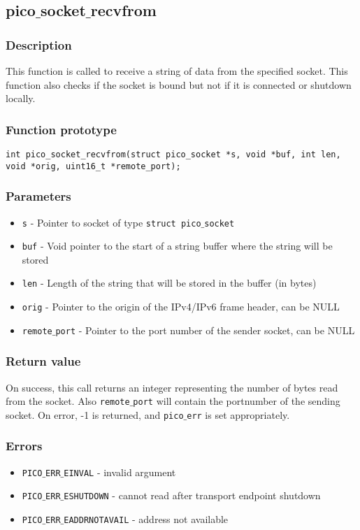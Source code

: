 \subsection{pico$\_$socket$\_$recvfrom}

\subsubsection*{Description}
This function is called to receive a string of data from the specified socket.
This function also checks if the socket is bound but not if it is connected or shutdown locally. 

\subsubsection*{Function prototype}
\begin{verbatim}
int pico_socket_recvfrom(struct pico_socket *s, void *buf, int len,
void *orig, uint16_t *remote_port);
\end{verbatim}

\subsubsection*{Parameters}
\begin{itemize}[noitemsep]
\item \texttt{s} - Pointer to socket of type \texttt{struct pico$\_$socket}
\item \texttt{buf} - Void pointer to the start of a string buffer where the string will be stored
\item \texttt{len} - Length of the string that will be stored in the buffer (in bytes)
\item \texttt{orig} - Pointer to the origin of the IPv4/IPv6 frame header, can be NULL
\item \texttt{remote$\_$port} - Pointer to the port number of the sender socket, can be NULL
\end{itemize}

\subsubsection*{Return value}
On success, this call returns an integer representing the number of bytes read from the socket. Also
\texttt{remote$\_$port} will contain the portnumber of the sending socket.
On error, -1 is returned, and \texttt{pico$\_$err} is set appropriately.

\subsubsection*{Errors}
\begin{itemize}[noitemsep]
\item \texttt{PICO$\_$ERR$\_$EINVAL} - invalid argument
\item \texttt{PICO$\_$ERR$\_$ESHUTDOWN} - cannot read after transport endpoint shutdown
\item \texttt{PICO$\_$ERR$\_$EADDRNOTAVAIL} - address not available
\end{itemize}

